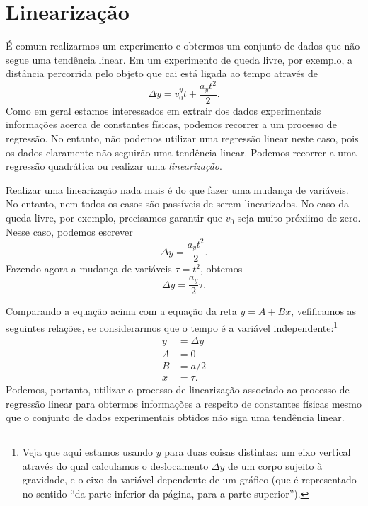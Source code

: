 \section{Linearização}

É comum realizarmos um experimento e obtermos um conjunto de dados que não segue uma tendência linear. Em um experimento de queda livre, por exemplo, a distância percorrida pelo objeto que cai está ligada ao tempo através de
\begin{equation}
	\Delta y = v_0^y t + \frac{a_yt^2}{2}.
\end{equation}
%
Como em geral estamos interessados em extrair dos dados experimentais informações acerca de constantes físicas, podemos recorrer a um processo de regressão. No entanto, não podemos utilizar uma regressão linear neste caso, pois os dados claramente não seguirão uma tendência linear. Podemos recorrer a uma regressão quadrática ou realizar uma \emph{linearização}.

Realizar uma linearização nada mais é do que fazer uma mudança de variáveis. No entanto, nem todos os casos são passíveis de serem linearizados. No caso da queda livre, por exemplo, precisamos garantir que $v_0$ seja muito próxiimo de zero. Nesse caso, podemos escrever
\begin{equation}
	\Delta y = \frac{a_yt^2}{2}.
\end{equation}
%
Fazendo agora a mudança de variáveis $\tau = t^2$, obtemos
\begin{equation}
	\Delta y = \frac{a_y}{2}\tau.
\end{equation}

Comparando a equação acima com a equação da reta $y = A + Bx$, vefificamos as seguintes relações, se considerarmos que o tempo é a variável independente:\footnote{Veja que aqui estamos usando $y$ para duas coisas distintas: um eixo vertical através do qual calculamos o deslocamento $\Delta y$ de um corpo sujeito à gravidade, e o eixo da variável dependente de um gráfico (que é representado no sentido ``da parte inferior da página, para a parte superior'').}
\begin{align}
	y &= \Delta y \\
	A &= 0 \\
	B &= a/2 \\
	x &= \tau.
\end{align}
%
Podemos, portanto, utilizar o processo de linearização associado ao processo de regressão linear para obtermos informações a respeito de constantes físicas mesmo que o conjunto de dados experimentais obtidos não siga uma tendência linear.


